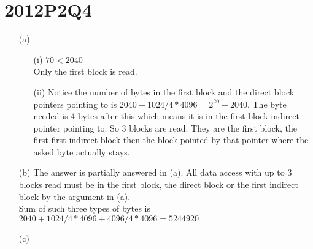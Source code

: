 \documentclass[10pt,twoside,a4paper]{article}
\begin{document}
\section{2012P2Q4}
\begin{itemize}
\item[(a)]
\begin{itemize}
\item[(i)]
$70<2040$
\\Only the first block is read.
\item[(ii)]
Notice the number of bytes in the first block and the direct block pointers pointing to is $2040 + 1024/4*4096 = 2^{20} + 2040 $.
The byte needed is 4 bytes after this which means it is in the first block indirect pointer pointing to. So 3 blocks are read. They are the first block, the first first indirect block then the block pointed by that pointer where the asked byte actually stays.
\end{itemize}
\item[(b)]
The answer is partially answered in (a). All data access with up to 3 blocks read must be in the first block, the direct block or the first indirect block by the argument in (a).
\\Sum of such three types of bytes is $2040+1024/4*4096+4096/4*4096=5244920$
\item[(c)]


\end{itemize}
\end{document}
